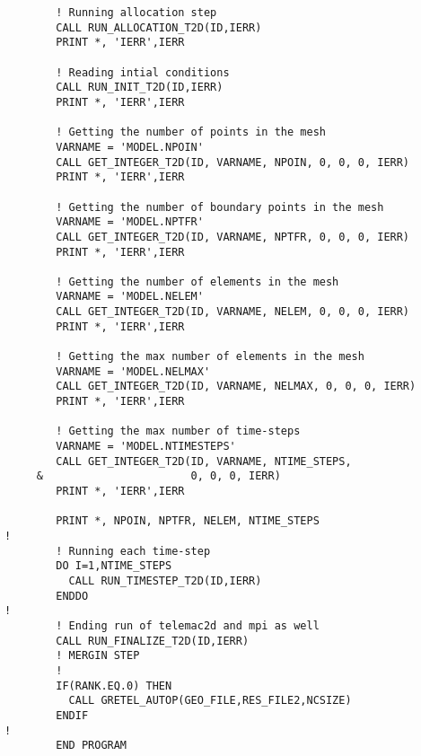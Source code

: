 \begin{lstlisting}
        ! Running allocation step
        CALL RUN_ALLOCATION_T2D(ID,IERR)
        PRINT *, 'IERR',IERR
 
        ! Reading intial conditions
        CALL RUN_INIT_T2D(ID,IERR)
        PRINT *, 'IERR',IERR

        ! Getting the number of points in the mesh
        VARNAME = 'MODEL.NPOIN'
        CALL GET_INTEGER_T2D(ID, VARNAME, NPOIN, 0, 0, 0, IERR)
        PRINT *, 'IERR',IERR

        ! Getting the number of boundary points in the mesh
        VARNAME = 'MODEL.NPTFR'
        CALL GET_INTEGER_T2D(ID, VARNAME, NPTFR, 0, 0, 0, IERR)
        PRINT *, 'IERR',IERR

        ! Getting the number of elements in the mesh
        VARNAME = 'MODEL.NELEM'
        CALL GET_INTEGER_T2D(ID, VARNAME, NELEM, 0, 0, 0, IERR)
        PRINT *, 'IERR',IERR

        ! Getting the max number of elements in the mesh
        VARNAME = 'MODEL.NELMAX'
        CALL GET_INTEGER_T2D(ID, VARNAME, NELMAX, 0, 0, 0, IERR)
        PRINT *, 'IERR',IERR

        ! Getting the max number of time-steps
        VARNAME = 'MODEL.NTIMESTEPS'
        CALL GET_INTEGER_T2D(ID, VARNAME, NTIME_STEPS, 
     &                       0, 0, 0, IERR)
        PRINT *, 'IERR',IERR

        PRINT *, NPOIN, NPTFR, NELEM, NTIME_STEPS
!
        ! Running each time-step
        DO I=1,NTIME_STEPS
          CALL RUN_TIMESTEP_T2D(ID,IERR)
        ENDDO
!
        ! Ending run of telemac2d and mpi as well
        CALL RUN_FINALIZE_T2D(ID,IERR)
        ! MERGIN STEP
        ! 
        IF(RANK.EQ.0) THEN
          CALL GRETEL_AUTOP(GEO_FILE,RES_FILE2,NCSIZE)
        ENDIF
!
        END PROGRAM


\end{lstlisting}
